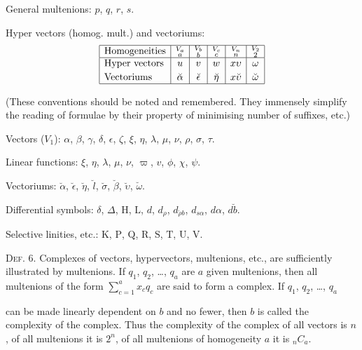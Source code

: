 \documentclass[11pt]{article}
\begin{document}
\noindent General multenions: $p$, $q$, $r$, $s$.

\noindent Hyper vectors (homog. mult.) and vectoriums:
\[
\begin{array}{|l|c|c|c|c|c|}\hline
\text{Homogeneities} & \substack{V_a\\a} & \substack{V_b\\b} & \substack{V_c\\c} & \substack{V_n\\n} & \substack{V_2\\2}\\ \hline
\text{Hyper vectors} & u & v & w & x\upsilon & \omega \\[2pt]
\text{Vectoriums} & \breve{\alpha} & \breve{\epsilon} & \breve{\eta} & x\breve{\upsilon} & \breve{\omega} \\ \hline
\end{array}
\]

\noindent (These conventions should be noted and remembered. They immensely
simplify the reading of formulae by their property of minimising number of
suffixes, etc.)

Vectors ($V_1$): $\alpha$, $\beta$, $\gamma$, $\delta$, $\epsilon$,
$\zeta$, $\xi$, $\eta$, $\lambda$, $\mu$, $\nu$, $\rho$, $\sigma$, $\tau$.

Linear functions: $\xi$, $\eta$, $\lambda$, $\mu$, $\nu$, $\varpi$,
$v$, $\phi$, $\chi$, $\psi$.

Vectoriums: $\breve{\alpha}$, $\breve{\epsilon}$, $\breve{\eta}$,
$\breve{l}$, $\breve{\sigma}$, $\breve{\beta}$, $\breve{\upsilon}$, $\breve{\omega}$.

Differential symbols: $\delta$, $\Delta$, $\mathrm{H}$, $\mathrm{L}$,
$d$, $d_\rho$, $d_{\breve{\rho}b}$, $d_{s\alpha}$, $d\alpha$, $d\breve{b}$.

Selective linities, etc.: $\mathrm{K}$, $\mathrm{P}$, $\mathrm{Q}$,
$\mathrm{R}$, $\mathrm{S}$, $\mathrm{T}$, $\mathrm{U}$, $\mathrm{V}$.

\textsc{Def. 6.} Complexes of vectors, hypervectors, multenions,
etc., are sufficiently illustrated by multenions. If $q_1$, $q_2$, \ldots,
$q_a$ are $a$ given multenions, then all multenions of the form
$\sum_{c=1}^{a}x_cq_c$ are said to form a complex. If $q_1$, $q_2$, \ldots,
$q_a$

can be made linearly dependent on $b$ and no fewer, then $b$ is called the complexity of the complex. Thus the complexity of the complex of all vectors is $n$, of all multenions it is $2^n$, of all multenions of homogeneity $a$ it is ${}_nC_a$.
\end{document}
